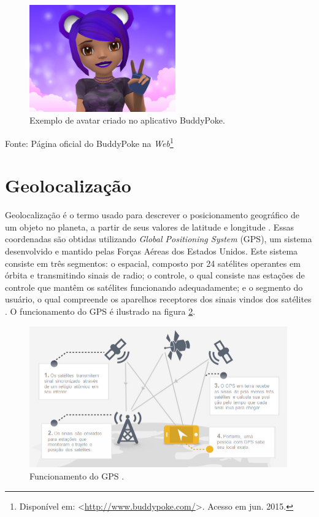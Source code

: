 \begin{figure}[hb]
    \caption{Exemplo de avatar criado no aplicativo BuddyPoke.}
    \centerline{\includegraphics[width=17em]{figuras/avatar.png}}
    \label{fig:avatar}
\end{figure}
\centerline{Fonte: Página oficial do BuddyPoke na \textit{Web}\footnote{Disponível em: <\url{http://www.buddypoke.com/}>. Acesso em jun. 2015.}}

\section{Geolocalização}
Geolocalização é o termo usado para descrever o posicionamento geográfico de um objeto no planeta, a partir de seus valores de latitude e longitude \cite{aires2014}. Essas coordenadas são obtidas utilizando \textit{Global Positioning System} (GPS), um sistema desenvolvido e mantido pelas Forças Aéreas dos Estados Unidos. Este sistema consiste em três segmentos: o espacial, composto por 24 satélites operantes em órbita e transmitindo sinais de radio; o controle, o qual consiste nas estações de controle que mantêm os satélites funcionando adequadamente; e o segmento do usuário, o qual compreende os aparelhos receptores dos sinais vindos dos satélites \cite{gpsgov}. O funcionamento do GPS é ilustrado na figura \ref{fig:gps}. \par

\begin{figure}[h]
    \caption[Funcionamento do GPS]{Funcionamento do GPS \cite{cesani2013}.}
    \centerline{\includegraphics[width=30em]{figuras/gps.png}}
    \label{fig:gps}
\end{figure}

